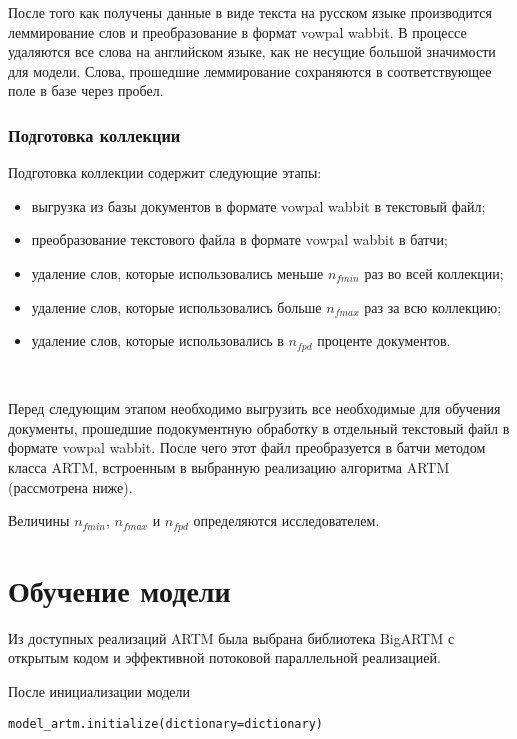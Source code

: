 После того как получены данные в виде текста на русском языке производится леммирование слов и преобразование в формат vowpal wabbit. В процессе удаляются все слова на английском языке, как не несущие большой значимости для модели. Слова, прошедшие леммирование сохраняются в соответствующее поле в базе через пробел.

\subsubsection{Подготовка коллекции}

Подготовка коллекции содержит следующие этапы:

\begin{itemize}
    \item выгрузка из базы документов в формате vowpal wabbit в текстовый файл;
    \item преобразование текстового файла в формате vowpal wabbit в батчи;
    \item удаление слов, которые использовались меньше $n_{fmin}$ раз во всей коллекции;
    \item удаление слов, которые использовались больше $n_{fmax}$ раз за всю коллекцию;
    \item удаление слов, которые использовались в $n_{fpd}$ проценте документов.
\end{itemize}
~\

Перед следующим этапом необходимо выгрузить все необходимые для обучения документы, прошедшие подокументную обработку в отдельный текстовый файл в формате vowpal wabbit. После чего этот файл преобразуется в батчи методом класса ARTM, встроенным в выбранную реализацию алгоритма ARTM (рассмотрена ниже).

Величины $n_{fmin}$, $n_{fmax}$ и $n_{fpd}$ определяются исследователем.

\section{Обучение модели}

Из доступных реализаций ARTM была выбрана библиотека BigARTM с открытым кодом и эффективной потоковой параллельной реализацией. 

После инициализации модели

\begin{lstlisting}
model_artm.initialize(dictionary=dictionary)
\end{lstlisting}

